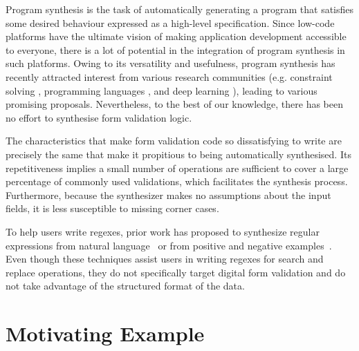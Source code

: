 Program synthesis is the task of automatically generating a program that satisfies some desired behaviour expressed as a high-level specification.
Since low-code platforms have the ultimate vision of making application development accessible to everyone, there is a lot of potential in the integration of program synthesis in such platforms.
Owing to its versatility and usefulness, program synthesis has recently attracted interest from various research communities (e.g.
constraint solving \cite{DBLP:conf/ijcai/KolbTPR18,Orvalho19,DBLP:journals/pacmpl/Yaghmazadeh0DD17}, 
programming languages \cite{DBLP:conf/pldi/FengMBD18,DBLP:conf/pldi/FengMGDC17,DBLP:conf/pldi/WangCB17},
and deep learning \cite{DBLP:conf/iclr/BalogGBNT17,DBLP:conf/iclr/ParisottoMS0ZK17}), leading to various promising proposals. Nevertheless, to the best of our knowledge, there has been no effort to synthesise form validation logic.


The characteristics that make form validation code so dissatisfying to write are precisely the same that make it propitious to being automatically synthesised.
Its repetitiveness implies a small number of operations are sufficient to cover a large percentage of commonly used validations, which facilitates the synthesis process.
Furthermore, because the synthesizer makes no assumptions about the input fields, it is less susceptible to missing corner cases.


To help users write regexes, prior work has proposed to synthesize regular expressions from natural language~\cite{Regel20,DBLP:conf/naacl/KushmanB13,DBLP:conf/emnlp/LocascioNDKB16,DBLP:conf/emnlp/ZhongGYPXLLZ18} or from positive and negative examples~\cite{Regel20,DBLP:conf/popl/Gulwani11,AlphaRegex16,Fidex16}. Even though these techniques assist users in writing regexes for search and replace operations, they do not specifically target digital form validation and do not take advantage of the structured format of the data.


\section{Motivating Example}\label{ex:1}

